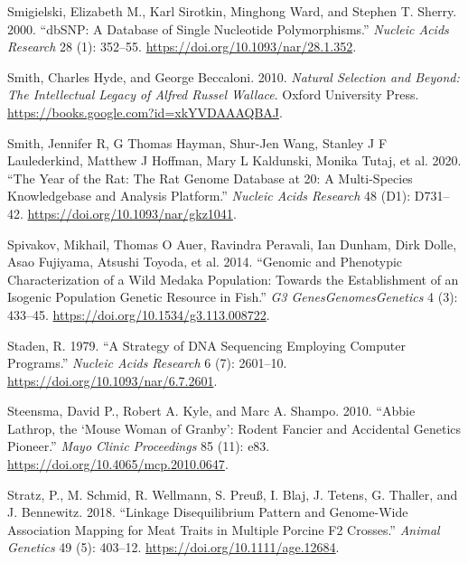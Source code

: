 \documentclass[
]{book}
\newlength{\cslhangindent}
\newlength{\cslentryspacingunit} %
\newenvironment{CSLReferences}[2] %
 {%
  \setlength{\parindent}{0pt}
  \ifodd #1
  \let\oldpar\par
  \def\par{\hangindent=\cslhangindent\oldpar}
  \fi
  \setlength{\parskip}{#2\cslentryspacingunit}
 }%
 {}
\begin{document}
\begin{CSLReferences}{1}{0}
\leavevmode{}%
Smigielski, Elizabeth M., Karl Sirotkin, Minghong Ward, and Stephen T. Sherry. 2000. {``{dbSNP}: A Database of Single Nucleotide Polymorphisms.''} \emph{Nucleic Acids Research} 28 (1): 352--55. \url{https://doi.org/10.1093/nar/28.1.352}.

\leavevmode{}%
Smith, Charles Hyde, and George Beccaloni. 2010. \emph{Natural {Selection} and {Beyond}: {The Intellectual Legacy} of {Alfred Russel Wallace}}. {Oxford University Press}. \url{https://books.google.com?id=xkYVDAAAQBAJ}.

\leavevmode{}%
Smith, Jennifer R, G Thomas Hayman, Shur-Jen Wang, Stanley J F Laulederkind, Matthew J Hoffman, Mary L Kaldunski, Monika Tutaj, et al. 2020. {``The {Year} of the {Rat}: {The Rat Genome Database} at 20: A Multi-Species Knowledgebase and Analysis Platform.''} \emph{Nucleic Acids Research} 48 (D1): D731--42. \url{https://doi.org/10.1093/nar/gkz1041}.

\leavevmode{}%
Spivakov, Mikhail, Thomas O Auer, Ravindra Peravali, Ian Dunham, Dirk Dolle, Asao Fujiyama, Atsushi Toyoda, et al. 2014. {``Genomic and {Phenotypic Characterization} of a {Wild Medaka Population}: {Towards} the {Establishment} of an {Isogenic Population Genetic Resource} in {Fish}.''} \emph{G3 Genes\textbar Genomes\textbar Genetics} 4 (3): 433--45. \url{https://doi.org/10.1534/g3.113.008722}.

\leavevmode{}%
Staden, R. 1979. {``A Strategy of {DNA} Sequencing Employing Computer Programs.''} \emph{Nucleic Acids Research} 6 (7): 2601--10. \url{https://doi.org/10.1093/nar/6.7.2601}.

\leavevmode{}%
Steensma, David P., Robert A. Kyle, and Marc A. Shampo. 2010. {``Abbie {Lathrop}, the {`{Mouse Woman} of {Granby}'}: {Rodent Fancier} and {Accidental Genetics Pioneer}.''} \emph{Mayo Clinic Proceedings} 85 (11): e83. \url{https://doi.org/10.4065/mcp.2010.0647}.

\leavevmode{}%
Stratz, P., M. Schmid, R. Wellmann, S. Preuß, I. Blaj, J. Tetens, G. Thaller, and J. Bennewitz. 2018. {``Linkage Disequilibrium Pattern and Genome-Wide Association Mapping for Meat Traits in Multiple Porcine {F2} Crosses.''} \emph{Animal Genetics} 49 (5): 403--12. \url{https://doi.org/10.1111/age.12684}.


\end{CSLReferences}
\end{document}
